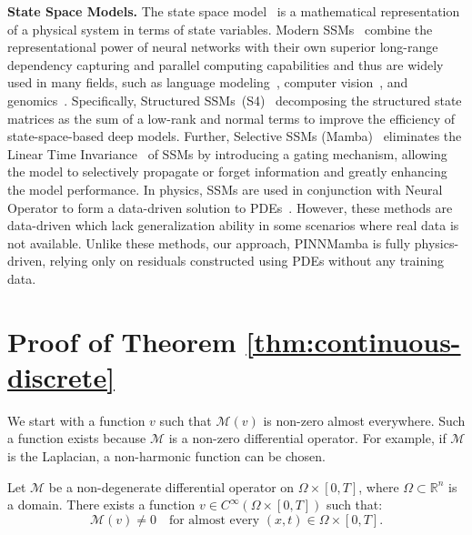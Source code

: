 \textbf{State Space Models.} The state space model~\cite{kalman1960new} is a mathematical representation of a physical system in terms of state variables. 
    Modern SSMs~\cite{gu2022efficiently,smith2023simplified,gu2023mamba} combine the representational power of neural networks with their own superior long-range dependency capturing and parallel computing capabilities and thus are widely used in many fields, such as language modeling~\cite{fu2023hungry,poli2023hyena,gu2023mamba,pmlr-v235-dao24a}, computer vision~\cite{pmlr-v235-zhu24f,liu2024vmamba}, and genomics~\cite{gu2023mamba,nguyen2024sequence}. Specifically, Structured SSMs~(S4)~\cite{gu2022efficiently} decomposing the structured state matrices as the sum of a low-rank
and normal terms to improve the efficiency of state-space-based deep models. Further, Selective SSMs (Mamba)~\cite{gu2023mamba} eliminates the Linear Time Invariance~\cite{sain1969invertibility} of SSMs by introducing a gating mechanism, allowing the model to selectively propagate or forget information and greatly enhancing the model performance. In physics, SSMs are used in conjunction with Neural Operator to form a data-driven solution to PDEs~\cite{zheng2024aliasfree,hu2024state}. 
However, these methods are data-driven which lack generalization ability in some scenarios where real data is not available. Unlike these methods, our approach, PINNMamba is fully physics-driven, relying only on residuals constructed using PDEs without any training data.

%



\section{Proof of Theorem \ref{thm:continuous-discrete}}
\label{apx:proof3_1}

We start with a function $v$ such that $\mathcal{M}(v)$ is non-zero almost everywhere. Such a function exists because $\mathcal{M}$ is a non-zero differential operator. For example, if $\mathcal{M}$ is the Laplacian, a non-harmonic function can be chosen.

\begin{lemma}
    Let $\mathcal{M}$ be a non-degenerate differential operator on $\Omega \times [0,T]$, where $\Omega \subset \mathbb{R}^n$ is a domain. There exists a function $v \in C^\infty(\Omega \times [0,T])$ such that:  
$$
\mathcal{M}(v) \neq 0 \quad \text{for almost every } (x,t) \in \Omega \times [0,T].
$$
\end{lemma}


